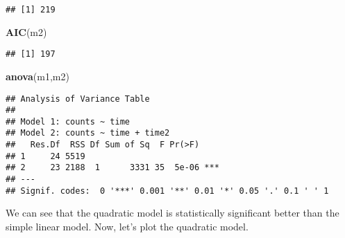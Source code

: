 \documentclass[]{book}
\newenvironment{Shaded}{\begin{snugshade}}{\end{snugshade}}
\newcommand{\KeywordTok}[1]{\textcolor[rgb]{0.13,0.29,0.53}{\textbf{#1}}}
\newcommand{\DataTypeTok}[1]{\textcolor[rgb]{0.13,0.29,0.53}{#1}}
\newcommand{\DecValTok}[1]{\textcolor[rgb]{0.00,0.00,0.81}{#1}}
\newcommand{\FloatTok}[1]{\textcolor[rgb]{0.00,0.00,0.81}{#1}}
\newcommand{\StringTok}[1]{\textcolor[rgb]{0.31,0.60,0.02}{#1}}
\newcommand{\OperatorTok}[1]{\textcolor[rgb]{0.81,0.36,0.00}{\textbf{#1}}}
\newcommand{\NormalTok}[1]{#1}
\theoremstyle{definition}
\theoremstyle{definition}
\theoremstyle{definition}
\theoremstyle{remark}
\begin{document}
\begin{verbatim}
## [1] 219
\end{verbatim}

\begin{Shaded}
\begin{Highlighting}[]
\KeywordTok{AIC}\NormalTok{(m2)}
\end{Highlighting}
\end{Shaded}

\begin{verbatim}
## [1] 197
\end{verbatim}

\begin{Shaded}
\begin{Highlighting}[]
\KeywordTok{anova}\NormalTok{(m1,m2)}
\end{Highlighting}
\end{Shaded}

\begin{verbatim}
## Analysis of Variance Table
## 
## Model 1: counts ~ time
## Model 2: counts ~ time + time2
##   Res.Df  RSS Df Sum of Sq  F Pr(>F)    
## 1     24 5519                           
## 2     23 2188  1      3331 35  5e-06 ***
## ---
## Signif. codes:  0 '***' 0.001 '**' 0.01 '*' 0.05 '.' 0.1 ' ' 1
\end{verbatim}

We can see that the quadratic model is statistically significant better
than the simple linear model. Now, let's plot the quadratic model.

\begin{Shaded}
\end{Shaded}
\end{document}
